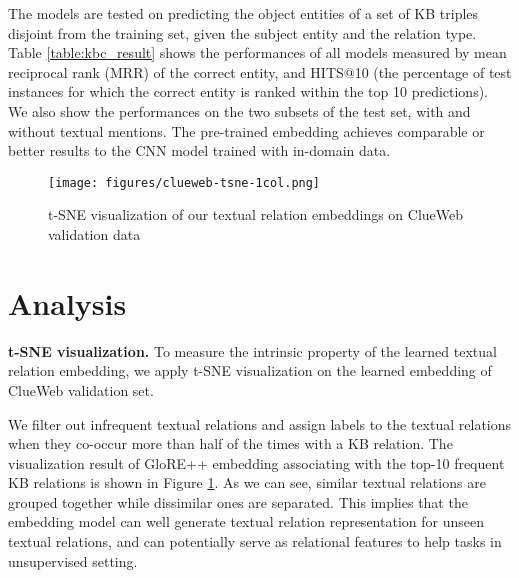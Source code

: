 \documentclass[11pt,a4paper]{article}
\begin{document}
The models are tested on predicting the object entities of a set of KB triples disjoint from the training set, given the subject entity and the relation type.
Table \ref{table:kbc_result} shows the performances of all models measured by mean reciprocal rank (MRR) of the correct entity, and HITS@10 (the percentage of test instances for which the correct entity is ranked within the top 10 predictions). We also show the performances on the two subsets of the test set, with and without textual mentions. The pre-trained embedding achieves comparable or better results to the CNN model trained with in-domain data. 


\begin{figure}[h]
\begin{center}
\texttt{[image: figures/clueweb-tsne-1col.png]}
\caption{t-SNE visualization of our textual relation embeddings on ClueWeb validation data}
\label{fig:tsne}
\end{center}
\end{figure}
\section{Analysis}
\label{sec:analysis}
\textbf{t-SNE visualization.} To measure the intrinsic property of the learned textual relation embedding, we apply t-SNE visualization \cite{maaten2008visualizing} on the learned embedding of ClueWeb validation set.

We filter out infrequent textual relations and assign labels to the textual relations when they co-occur more than half of the times with a KB relation. The visualization result of GloRE++ embedding associating with the top-10 frequent KB relations is shown in Figure \ref{fig:tsne}.
As we can see, similar textual relations are grouped together while dissimilar ones are separated. This implies that the embedding model can well generate textual relation representation for unseen textual relations, and can potentially serve as relational features to help tasks in unsupervised setting.
\end{document}
